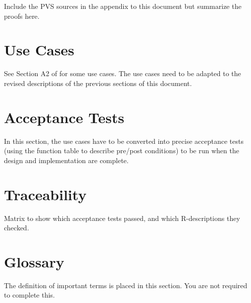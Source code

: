 \documentclass[fontsize=12pt,paper=letter,twoside]{scrartcl}
\begin{document}
Include the PVS sources in the appendix to this document but summarize the proofs here.

\section{Use Cases}
See Section A2 of \cite{REMH} for some use cases. The use cases need to be adapted to the revised descriptions of the previous sections of this document.

\section{Acceptance Tests}
In this section, the use cases have to be converted into precise acceptance tests (using the function table to describe pre/post conditions) to be run when the design and implementation are complete.

\section{Traceability}
Matrix to show which acceptance tests passed, and which R-descriptions they checked.

\section{Glossary}
The definition of important terms is placed in this section. You are not required to complete this.



\end{document}
